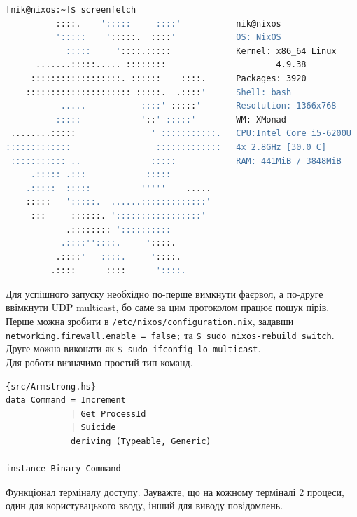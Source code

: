 \documentclass[12pt]{article}
\begin{document}
\begin{lstlisting}[language=bash, caption=Конфігурація другого комп'ютера]
[nik@nixos:~]$ screenfetch 
          ::::.    ':::::     ::::'           nik@nixos
          ':::::    ':::::.  ::::'            OS: NixOS 
            :::::     '::::.:::::             Kernel: x86_64 Linux 
      .......:::::..... ::::::::                      4.9.38
     ::::::::::::::::::. ::::::    ::::.      Packages: 3920
    ::::::::::::::::::::: :::::.  .::::'      Shell: bash
           .....           ::::' :::::'       Resolution: 1366x768
          :::::            '::' :::::'        WM: XMonad
 ........:::::               ' :::::::::::.   CPU:Intel Core i5-6200U 
:::::::::::::                 :::::::::::::   4x 2.8GHz [30.0 C]
 ::::::::::: ..              :::::            RAM: 441MiB / 3848MiB
     .::::: .:::            :::::            
    .:::::  :::::          '''''    .....    
    :::::   ':::::.  ......:::::::::::::'    
     :::     ::::::. ':::::::::::::::::'     
            .:::::::: '::::::::::            
           .::::''::::.     '::::.           
          .::::'   ::::.     '::::.          
         .::::      ::::      '::::.         
\end{lstlisting}

Для успішного запуску
необхідно по-перше вимкнути фаєрвол, а по-друге ввімкнути UDP multicast, 
бо саме за цим протоколом працює пошук пірів. Перше можна зробити в
\lstinline{/etc/nixos/configuration.nix}, задавши 
\lstinline{networking.firewall.enable = false;} та \lstinline{$ sudo nixos-rebuild switch}.
Друге можна виконати як \lstinline{$ sudo ifconfig lo multicast}.\\

Для роботи визначимо простий тип команд.\\

\begin{lstlisting}{src/Armstrong.hs}
data Command = Increment
             | Get ProcessId
             | Suicide
             deriving (Typeable, Generic)

instance Binary Command
\end{lstlisting}

Функціонал терміналу доступу. Зауважте, що на кожному терміналі 2 процеси, один для користувацького вводу, інший для виводу повідомлень.\\
\end{document}
